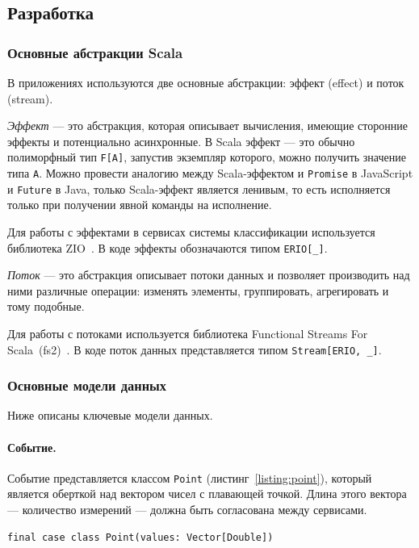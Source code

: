 \documentclass[14pt]{article}
\begin{document}
\subsection{Разработка}
\subsubsection{Основные абстракции Scala}
\label{section:scalaAbstractions}
В приложениях используются две основные абстракции: эффект (effect) и поток (stream).

\emph{Эффект} --- это абстракция, которая описывает вычисления, имеющие сторонние эффекты и потенциально асинхронные. В Scala эффект --- это обычно полиморфный тип \verb|F[A]|, запустив экземпляр которого, можно получить значение типа \verb|A|. Можно провести аналогию между Scala-эффектом и \verb|Promise| в JavaScript и \verb|Future| в Java, только Scala-эффект является ленивым, то есть исполняется только при получении явной команды на исполнение.

Для работы с эффектами в сервисах системы классификации используется библиотека ZIO~\cite{zio}. В коде эффекты обозначаются типом \verb|ERIO[_]|.

\emph{Поток} --- это абстракция описывает потоки данных и позволяет производить над ними различные операции: изменять элементы, группировать, агрегировать и тому подобные.

Для работы с потоками используется библиотека Functional Streams For Scala~(fs2)~\cite{fs2}. В коде поток данных представляется типом \verb|Stream[ERIO, _]|.

\subsubsection{Основные модели данных}
Ниже описаны ключевые модели данных. 
\paragraph{Событие.} Событие представляется классом \verb|Point| (листинг~\ref{listing:point}), который является оберткой над вектором чисел с плавающей точкой. Длина этого вектора --- количество измерений --- должна быть согласована между сервисами.

\begin{lstlisting}[style=scalaStyle,caption={Класс, описывающий событие.},label={listing:point},captionpos=b, float]
final case class Point(values: Vector[Double])
\end{lstlisting}
\end{document}
